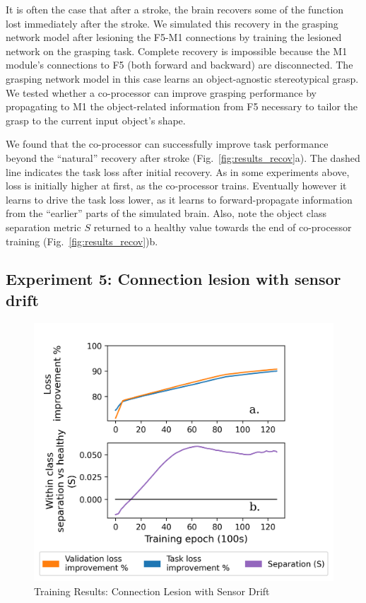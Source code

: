 \documentclass[12pt]{iopart}
\begin{document}
It is often the case that after a stroke, the brain recovers some of the function lost immediately after the
stroke. We simulated this recovery in the grasping network model after lesioning the F5-M1 connections by
training the lesioned network on the grasping task. Complete recovery is impossible because the M1 module's
connections to F5 (both forward and backward) are disconnected. The grasping network model in this case learns
an object-agnostic stereotypical grasp. We tested whether a co-processor can improve grasping performance by
propagating to M1 the object-related information from F5 necessary to tailor the grasp to the current
input object's shape.

We found that the co-processor can successfully improve task performance beyond the ``natural''
recovery after stroke (Fig.~\ref{fig:results_recov}a). The dashed line
indicates the task loss after initial recovery. As in some experiments above, loss is
initially higher at first, as the co-processor trains. Eventually however it learns
to drive the task loss lower, as it learns to forward-propagate information from the
``earlier'' parts of the simulated brain. Also, note the object class separation metric $S$
returned to a healthy value towards the end of co-processor training
(Fig.~\ref{fig:results_recov})b.

\subsection{Experiment 5: Connection lesion with sensor drift}
\begin{figure}[h]
\centering
\includegraphics[scale=1]{training_results_drift.png}
\caption{Training Results: Connection Lesion with Sensor Drift}
\label{fig:results_drift}
\end{figure}
\end{document}
